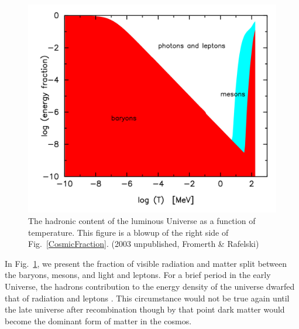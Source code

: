 \documentclass[universe,article,submit,moreauthors,pdftex,a4paper]{Definitions/mdpi}
\newcommand*{\rf}[1]{Fig.~{\ref{#1}}}
\begin{document}
\begin{figure}[ht]
\centering
\includegraphics[width=\textwidth]{./plots/hadron_content.png}
\caption{The hadronic content of the luminous Universe as a function of temperature. This figure is a blowup of the right side of \rf{CosmicFraction}. (2003 unpublished, Fromerth \& Rafelski) \cite{Rafelski:2019twp}}
\label{hadron_content}
\end{figure}

In \rf{hadron_content}, we present the fraction of visible radiation and matter split between the baryons, mesons, and light and leptons. For a brief period in the early Universe, the hadrons contribution to the energy density of the universe dwarfed that of radiation and leptons \cite{Rafelski:2019twp}. This circumstance would not be true again until the late universe after recombination though by that point dark matter would become the dominant form of matter in the cosmos.
\end{document}
